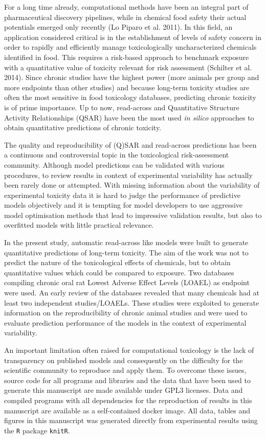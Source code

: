 \documentclass[]{achemso}
\begin{document}
For a long time already, computational methods have been an integral
part of pharmaceutical discovery pipelines, while in chemical food
safety their actual potentials emerged only recently (Lo Piparo et al.
2011). In this field, an application considered critical is in the
establishment of levels of safety concern in order to rapidly and
efficiently manage toxicologically uncharacterized chemicals identified
in food. This requires a risk-based approach to benchmark exposure with
a quantitative value of toxicity relevant for risk assessment (Schilter
et al. 2014). Since chronic studies have the highest power (more animals
per group and more endpoints than other studies) and because long-term
toxicity studies are often the most sensitive in food toxicology
databases, predicting chronic toxicity is of prime importance. Up to
now, read-across and Quantitative Structure Activity Relationships
(QSAR) have been the most used \emph{in silico} approaches to obtain
quantitative predictions of chronic toxicity.

The quality and reproducibility of (Q)SAR and read-across predictions
has been a continuous and controversial topic in the toxicological
risk-assessment community. Although model predictions can be validated
with various procedures, to review results in context of experimental
variability has actually been rarely done or attempted. With missing
information about the variability of experimental toxicity data it is
hard to judge the performance of predictive models objectively and it is
tempting for model developers to use aggressive model optimisation
methods that lead to impressive validation results, but also to
overfitted models with little practical relevance.

In the present study, automatic read-across like models were built to
generate quantitative predictions of long-term toxicity. The aim of the
work was not to predict the nature of the toxicological effects of
chemicals, but to obtain quantitative values which could be compared to
exposure. Two databases compiling chronic oral rat Lowest Adverse Effect
Levels (LOAEL) as endpoint were used. An early review of the databases
revealed that many chemicals had at least two independent
studies/LOAELs. These studies were exploited to generate information on
the reproducibility of chronic animal studies and were used to evaluate
prediction performance of the models in the context of experimental
variability.

An important limitation often raised for computational toxicology is the
lack of transparency on published models and consequently on the
difficulty for the scientific community to reproduce and apply them. To
overcome these issues, source code for all programs and libraries and
the data that have been used to generate this manuscript are made
available under GPL3 licenses. Data and compiled programs with all
dependencies for the reproduction of results in this manuscript are
available as a self-contained docker image. All data, tables and figures
in this manuscript was generated directly from experimental results
using the \texttt{R} package \texttt{knitR}.
\end{document}
